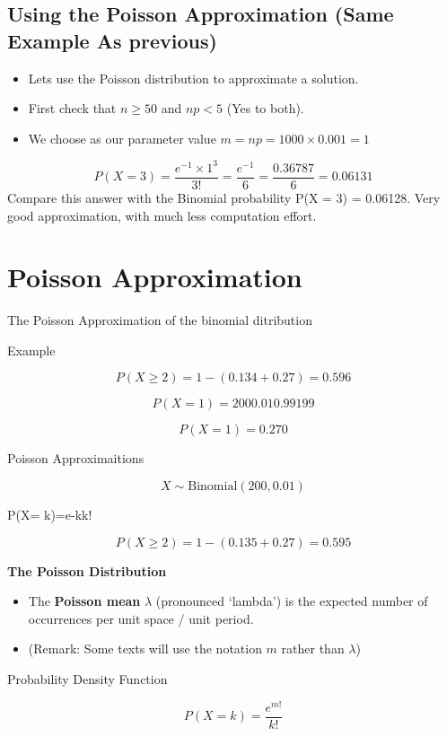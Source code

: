 \documentclass[]{article}
\begin{document}
\subsection{Using the Poisson Approximation (Same Example As previous)}
\begin{itemize}
\item Lets use the Poisson distribution to approximate a solution.
\item First check that $n \geq 50$ and $np < 5$ (Yes to both).
\item We choose as our parameter value $m = np = 1000 \times 0.001 = 1$
\end{itemize}
\[P(X = 3) = \frac{e^{-1} \times 1^3}{3!} = \frac{e^{-1}}{6} = \frac{0.36787}{6} = 0.06131 \]
Compare this answer with the Binomial probability
P(X = 3) = 0.06128.
Very good approximation, with much less computation effort.






\section{Poisson Approximation}
The Poisson Approximation of the binomial ditribution

Example

\[P(X \geq 2) = 1 - (0.134+0.27) = 0.596\]

\[P(X=1) = 200 0.01 0.99 199\]

\[P(X=1) = 0.270\]


Poisson Approximaitions


\[X \sim \mbox{Binomial}(200, 0.01) \]


P(X= k)=e-kk!




\[P(X \geq 2) = 1- (0.135+0.27) = 0.595\]






\noindent \textbf{The Poisson Distribution}
{
\begin{itemize}
\item The \textbf{Poisson mean} $\lambda$ (pronounced `lambda') is the expected number of occurrences per unit space / unit period.
\item (Remark:  Some texts will use the notation $m$ rather than $\lambda$)
\end{itemize}



Probability Density Function

\[P(X=k) = \frac{e^{m!}}{k!}\]
}
\end{document}
